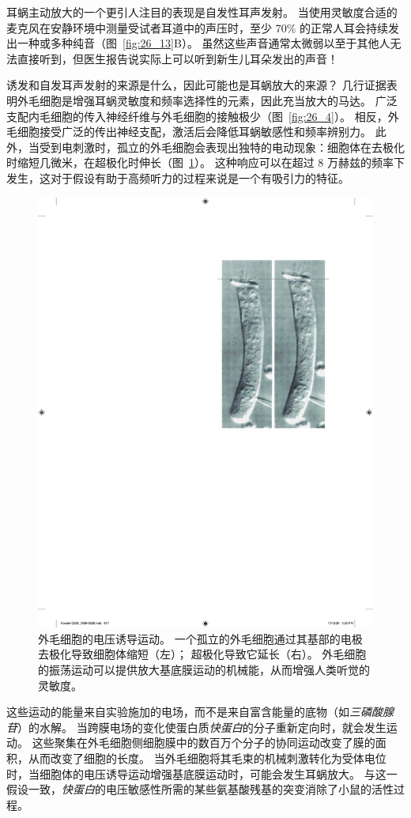 耳蜗主动放大的一个更引人注目的表现是自发性耳声发射。
当使用灵敏度合适的麦克风在安静环境中测量受试者耳道中的声压时，至少 70\% 的正常人耳会持续发出一种或多种纯音（图~\ref{fig:26_13}B）。
虽然这些声音通常太微弱以至于其他人无法直接听到，但医生报告说实际上可以听到新生儿耳朵发出的声音！


诱发和自发耳声发射的来源是什么，因此可能也是耳蜗放大的来源？
几行证据表明外毛细胞是增强耳蜗灵敏度和频率选择性的元素，因此充当放大的马达。
广泛支配内毛细胞的传入神经纤维与外毛细胞的接触极少（图~\ref{fig:26_4}）。
相反，外毛细胞接受广泛的传出神经支配，激活后会降低耳蜗敏感性和频率辨别力。
此外，当受到电刺激时，孤立的外毛细胞会表现出独特的电动现象：细胞体在去极化时缩短几微米，在超极化时伸长（图~\ref{fig:26_14}）。
这种响应可以在超过 8 万赫兹的频率下发生，这对于假设有助于高频听力的过程来说是一个有吸引力的特征。


\begin{figure}[htbp]
	\centering
	\includegraphics[width=0.5\linewidth]{chap26/fig_26_14}
	\caption{外毛细胞的电压诱导运动。
		一个孤立的外毛细胞通过其基部的电极去极化导致细胞体缩短（左）； 
		超极化导致它延长（右）。
		外毛细胞的振荡运动可以提供放大基底膜运动的机械能，从而增强人类听觉的灵敏度。}
	\label{fig:26_14}
\end{figure}


这些运动的能量来自实验施加的电场，而不是来自富含能量的底物（如\textit{三磷酸腺苷}）的水解。
当跨膜电场的变化使蛋白质\textit{快蛋白}的分子重新定向时，就会发生运动。
这些聚集在外毛细胞侧细胞膜中的数百万个分子的协同运动改变了膜的面积，从而改变了细胞的长度。
当外毛细胞将其毛束的机械刺激转化为受体电位时，当细胞体的电压诱导运动增强基底膜运动时，可能会发生耳蜗放大。
与这一假设一致，\textit{快蛋白}的电压敏感性所需的某些氨基酸残基的突变消除了小鼠的活性过程。


